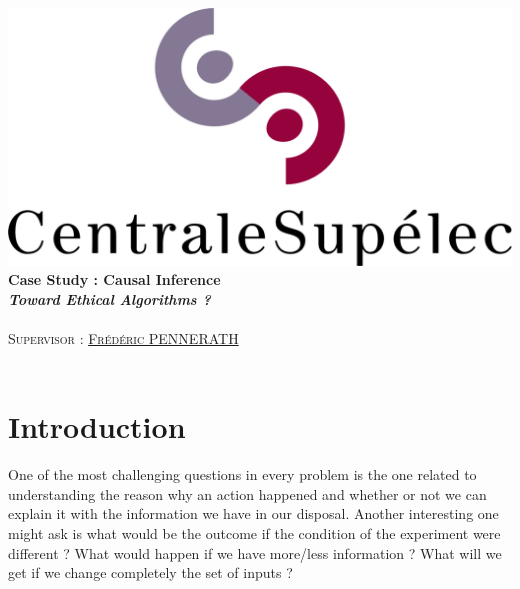\documentclass{article}
\author{\Large \textsc{\href{mailto:mohammed.fellaji@supelec.fr}{Mohammed FELLAJI}, \href{mailto:ahmed.benaissa@supelec.fr}{Ahmed BEN AISSA}}}
\date{September, 2020}
\begin{document}
\hypersetup{pdfborder=0 0 0} 		

\makeatletter
  \begin{titlepage}
  \centering
     {\large \textsc{   }}\\
     \vspace{1em}
    \centering
      \includegraphics[width=0.5 \textwidth]{figures/LogoCS.png} \\
    \vspace{4cm}
      {\LARGE\textbf{Case Study : Causal Inference}\\  
       \vspace{1em}
       {\large\textbf{
       \textit{\LARGE{Toward Ethical Algorithms ?}}}}\\  
    \vspace{4cm}
    \centering
     {\Large \@author} \\
     \vspace{1em}
        {\Large \textsc{Supervisor : \href{mailto:frederic.pennerath@centralesupelec.fr}{Frédéric PENNERATH}}}\\
        \vspace{3em}
        {\Large \@date} }\\
  \end{titlepage}
 
 
\makeatother

\tableofcontents





\newpage
\section{Introduction}
One of the most challenging questions in every problem is the one related to understanding the reason why an action happened and whether or not we can explain it with the information we have in our disposal. Another interesting one might ask is what would be the outcome if the condition of the experiment were different ? What would happen if we have more/less information ? What will we get if we change completely the set of inputs ?
\end{document}
